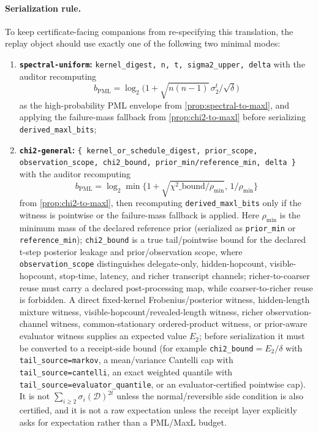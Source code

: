 \documentclass[11pt]{article}
\begin{document}
\paragraph{Serialization rule.}
To keep certificate-facing companions from re-specifying this translation, the replay object should use exactly one of the following two minimal modes:
\begin{enumerate}[leftmargin=1.4em]
\item \textbf{\texttt{spectral-uniform}:} \texttt{kernel\_digest, n, t, sigma2\_upper, delta} with the auditor recomputing
\[
 b_{\mathrm{PML}} = \log_2\!\Big(1+\sqrt{n(n-1)}\,\sigma_2^t/\sqrt{\delta}\Big)
\]
as the high-probability PML envelope from \cref{prop:spectral-to-maxl}, and applying the failure-mass fallback from \cref{prop:chi2-to-maxl} before serializing \texttt{derived\_maxl\_bits};
\item \textbf{\texttt{chi2-general}:} \texttt{\{ kernel\_or\_schedule\_digest, prior\_scope, observation\_scope, chi2\_bound, prior\_min/reference\_min, delta \}} with the auditor recomputing
\[
 b_{\mathrm{PML}} = \log_2\min\Big\{1+\sqrt{\chi^2\_\text{bound}/\rho_{\min}},\,1/\rho_{\min}\Big\}
\]
from \cref{prop:chi2-to-maxl}, then recomputing \texttt{derived\_maxl\_bits} only if the witness is pointwise or the failure-mass fallback is applied. Here $\rho_{\min}$ is the minimum mass of the declared reference prior (serialized as \texttt{prior\_min} or \texttt{reference\_min}); \texttt{chi2\_bound} is a true tail/pointwise bound for the declared t-step posterior leakage and prior/observation scope, where \texttt{observation\_scope} distinguishes delegate-only, hidden-hopcount, visible-hopcount, stop-time, latency, and richer transcript channels; richer-to-coarser reuse must carry a declared post-processing map, while coarser-to-richer reuse is forbidden. A direct fixed-kernel Frobenius/posterior witness, hidden-length mixture witness, visible-hopcount/revealed-length witness, richer observation-channel witness, common-stationary ordered-product witness, or prior-aware evaluator witness supplies an expected value $E_2$; before serialization it must be converted to a receipt-side bound (for example \texttt{chi2\_bound}$=E_2/\delta$ with \texttt{tail\_source=markov}, a mean/variance Cantelli cap with \texttt{tail\_source=cantelli}, an exact weighted quantile with \texttt{tail\_source=evaluator\_quantile}, or an evaluator-certified pointwise cap). It is not $\sum_{i\ge2}\sigma_i(\mathcal D)^{2t}$ unless the normal/reversible side condition is also certified, and it is not a raw expectation unless the receipt layer explicitly asks for expectation rather than a PML/MaxL budget.
\end{enumerate}
\end{document}
